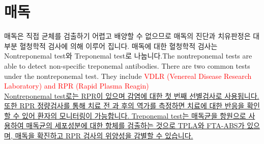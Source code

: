 \section{매독}
{
매독은 직접 균체를 검출하기 어렵고 배양할 수 없으므로 매독의 진단과 치유판정은 대부분 혈청학적 검사에 의해 이루어 집니다. 매독에 대한 혈청학적 검사는 Nontreponemal test와 Treponemal test로 나눕니다.The nontreponemal tests are able to detect non-specific treponemal antibodies. There are two common tests under the nontreponemal test. They include \textcolor{red}{VDLR (Venereal Disease Research Laboratory) and RPR (Rapid Plasma Reagin)}\\
\uline{Nontreponemal test로는 RPR이 있으며 감염에 대한 첫 번째 선별검사로 사용됩니다. 또한 RPR 정량검사를 통해 치료 전 과 후의 역가를 측정하면 치료에 대한 반응을 확인할 수 있어 환자의 모니터링이 가능합니다. Treponemal test는 매독균을 항원으로 사용하여 매독균의 세포성분에 대한 항체를 검출하는 것으로 TPLA와 FTA-ABS가 있으며, 매독을 확진하고 RPR 검사의 위양성을 감별할 수 있습니다.}
}

